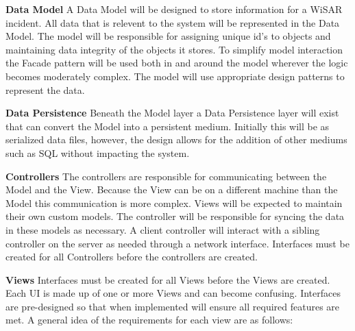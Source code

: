 \documentclass[12pt]{IEEEtran}
\begin{document}
\textbf{Data Model}  A Data Model will be designed to store information for a
WiSAR incident.  All data that is relevent to the system will be represented in
the Data Model.  The model will be responsible for assigning unique id's to
objects and maintaining data integrity of the objects it stores.  To simplify
model interaction the Facade pattern will be used both in and around the model
wherever the logic becomes moderately complex.  The model will use appropriate
design patterns to represent the data.

\textbf{Data Persistence}  Beneath the Model layer a Data Persistence layer will
exist that can convert the Model into a persistent medium.  Initially this will
be as serialized data files, however, the design allows for the addition of
other mediums such as SQL without impacting the system.

\textbf{Controllers}  The controllers are responsible for communicating between
the Model and the View.   Because the View can be on a different machine than
the Model this communication is more complex.  Views will be expected to
maintain their own custom models.  The controller will be responsible for
syncing the data in these models as necessary.  A client controller will
interact with a sibling controller on the server as needed through a network
interface.  Interfaces must be created for all Controllers before the
controllers are created.

\textbf{Views}  Interfaces must be created for all Views before the Views are
created.  Each UI is made up of one or more Views and can become confusing. 
Interfaces are pre-designed so that when implemented will ensure all required
features are met.  A general idea of the requirements for each view are as
follows:
\end{document}
